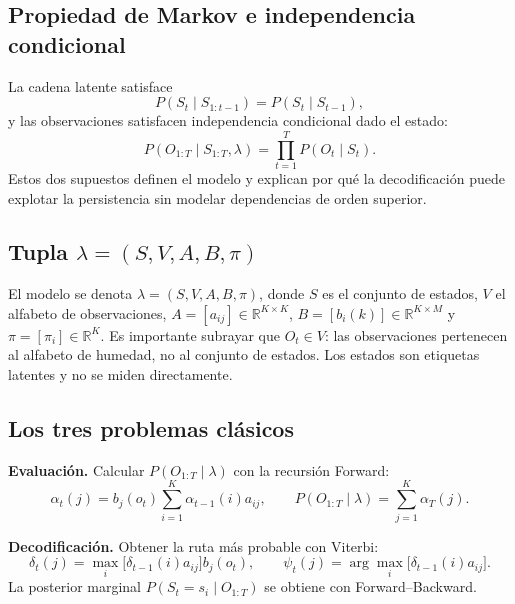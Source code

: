 \documentclass[11pt,letterpaper]{article}
\begin{document}
\subsection{Propiedad de Markov e independencia condicional}

La cadena latente satisface
\begin{equation}
P(S_t\mid S_{1:t-1})=P(S_t\mid S_{t-1}),
\end{equation}
y las observaciones satisfacen independencia condicional dado el estado:
\begin{equation}
P(O_{1:T}\mid S_{1:T},\lambda)=\prod_{t=1}^{T}P(O_t\mid S_t).
\end{equation}
Estos dos supuestos definen el modelo y explican por qué la decodificación puede explotar la persistencia sin modelar dependencias de orden superior.

\subsection{Tupla \(\lambda=(S,V,A,B,\pi)\)}

El modelo se denota \(\lambda=(S,V,A,B,\pi)\), donde \(S\) es el conjunto de estados, \(V\) el alfabeto de observaciones, \(A=[a_{ij}]\in\mathbb{R}^{K\times K}\), \(B=[b_i(k)]\in\mathbb{R}^{K\times M}\) y \(\pi=[\pi_i]\in\mathbb{R}^{K}\). Es importante subrayar que \(O_t\in V\): las observaciones pertenecen al alfabeto de humedad, no al conjunto de estados. Los estados son etiquetas latentes y no se miden directamente.

\subsection{Los tres problemas clásicos}

\textbf{Evaluación.} Calcular \(P(O_{1:T}\mid\lambda)\) con la recursión Forward:
\begin{equation}
\alpha_t(j)=b_j(o_t)\sum_{i=1}^{K}\alpha_{t-1}(i)a_{ij},
\qquad
P(O_{1:T}\mid\lambda)=\sum_{j=1}^{K}\alpha_T(j).
\end{equation}

\textbf{Decodificación.} Obtener la ruta más probable con Viterbi:
\begin{equation}
\delta_t(j)=\max_i\bigl[\delta_{t-1}(i)a_{ij}\bigr]b_j(o_t),
\qquad
\psi_t(j)=\arg\max_i\bigl[\delta_{t-1}(i)a_{ij}\bigr].
\end{equation}
La posterior marginal \(P(S_t=s_i\mid O_{1:T})\) se obtiene con Forward--Backward.
\end{document}
